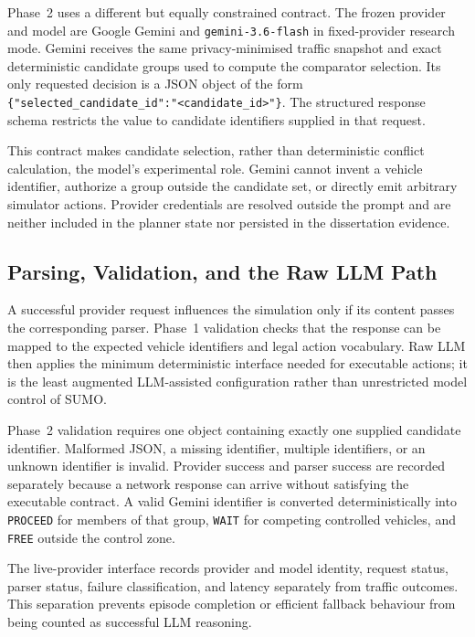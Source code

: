 \documentclass[letterpaper,10pt,conference]{ieeeconf}
\begin{document}
Phase~2 uses a different but equally constrained contract. The frozen provider and model are Google Gemini and \texttt{gemini-3.6-flash} in fixed-provider research mode. Gemini receives the same privacy-minimised traffic snapshot and exact deterministic candidate groups used to compute the comparator selection. Its only requested decision is a JSON object of the form \texttt{\{"selected\_candidate\_id":"<candidate\_id>"\}}. The structured response schema restricts the value to candidate identifiers supplied in that request.



This contract makes candidate selection, rather than deterministic conflict calculation, the model's experimental role. Gemini cannot invent a vehicle identifier, authorize a group outside the candidate set, or directly emit arbitrary simulator actions. Provider credentials are resolved outside the prompt and are neither included in the planner state nor persisted in the dissertation evidence.



\subsection{Parsing, Validation, and the Raw LLM Path}



A successful provider request influences the simulation only if its content passes the corresponding parser. Phase~1 validation checks that the response can be mapped to the expected vehicle identifiers and legal action vocabulary. Raw LLM then applies the minimum deterministic interface needed for executable actions; it is the least augmented LLM-assisted configuration rather than unrestricted model control of SUMO.



Phase~2 validation requires one object containing exactly one supplied candidate identifier. Malformed JSON, a missing identifier, multiple identifiers, or an unknown identifier is invalid. Provider success and parser success are recorded separately because a network response can arrive without satisfying the executable contract. A valid Gemini identifier is converted deterministically into \texttt{PROCEED} for members of that group, \texttt{WAIT} for competing controlled vehicles, and \texttt{FREE} outside the control zone.



The live-provider interface records provider and model identity, request status, parser status, failure classification, and latency separately from traffic outcomes. This separation prevents episode completion or efficient fallback behaviour from being counted as successful LLM reasoning.
\end{document}
